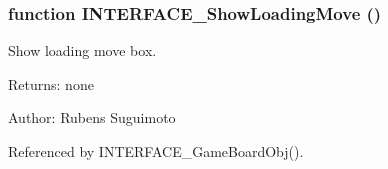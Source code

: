 \subsubsection[INTERFACE\_\-ShowLoadingMove]{\setlength{\rightskip}{0pt plus 5cm}function INTERFACE\_\-ShowLoadingMove ()}\label{board_8js_3d306ecdabf7d2fe16ed689277e43279}


Show loading move box. 

\begin{Desc}
\item[Returns:]none \end{Desc}
\begin{Desc}
\item[Author:]Rubens Suguimoto \end{Desc}


Referenced by INTERFACE\_\-GameBoardObj().